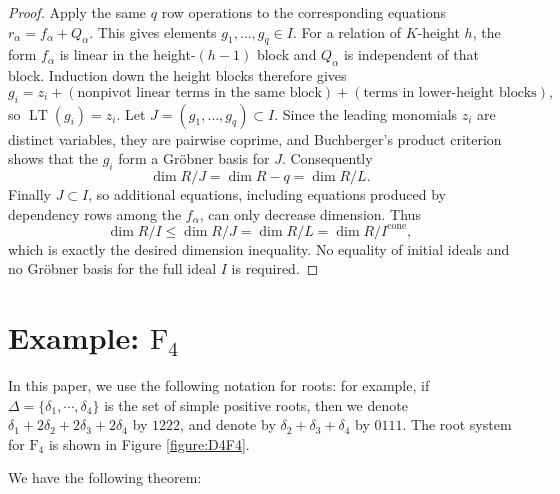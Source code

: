 \documentclass[11pt]{amsart}
\theoremstyle{definition}
\newcommand{\cone}{{\operatorname{cone}}}
\begin{document}
\begin{proof}
Apply the same $q$ row operations to the corresponding equations
$r_\alpha=f_\alpha+Q_\alpha$. This gives elements
$g_1,\ldots,g_q\in I$. For a relation of $K$-height $h$, the form $f_\alpha$ is
linear in the height-$(h-1)$ block and $Q_\alpha$ is independent of that block.
Induction down the height blocks therefore gives
\[
g_i=z_i+(\text{nonpivot linear terms in the same block})
       +(\text{terms in lower-height blocks}),
\]
so $\operatorname{LT}(g_i)=z_i$. Let
$J=(g_1,\ldots,g_q)\subset I$. Since the leading monomials $z_i$ are distinct
variables, they are pairwise coprime, and Buchberger's product criterion shows
that the $g_i$ form a Gr\"obner basis for $J$. Consequently
\[
\dim R/J=\dim R-q=\dim R/L.
\]
Finally $J\subset I$, so additional equations, including equations produced by
dependency rows among the $f_\alpha$, can only decrease dimension. Thus
\[
\dim R/I\le \dim R/J=\dim R/L=\dim R/I^\cone,
\]
which is exactly the desired dimension inequality. No equality of initial
ideals and no Gr\"obner basis for the full ideal $I$ is required.
\end{proof}


\section{Example: $\mathrm{F}_4$}


In this paper, we use the following notation for roots:
for example,
if $\Delta=\{\delta_1, \cdots, \delta_4\}$
is the set of simple positive roots,
then we denote $\delta_1+2\delta_2+2\delta_3+2\delta_4$
by $1222$, and denote by $\delta_2+\delta_3+\delta_4$
by $0111$.
The root system for $\mathrm{F}_4$
is shown in Figure \ref{figure:D4F4}.

We have the following theorem:
\end{document}
